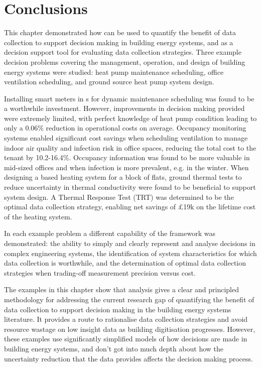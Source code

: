 \newpage
\section{Conclusions} \label{sec:demonstrations-conclusions}

This chapter demonstrated how  can be used to quantify the benefit of data collection to support decision making in building energy systems, and as a decision support tool for evaluating data collection strategies. Three example decision problems covering the management, operation, and design of building energy systems were studied: heat pump maintenance scheduling, office ventilation scheduling, and ground source heat pump system design.

Installing smart meters in s for dynamic maintenance scheduling was found to be a worthwhile investment. However, improvements in decision making provided were extremely limited, with perfect knowledge of heat pump condition leading to only a 0.06\% reduction in operational costs on average.
Occupancy monitoring systems enabled significant cost savings when scheduling ventilation to manage indoor air quality and infection risk in office spaces, reducing the total cost to the tenant by 10.2-16.4\%. Occupancy information was found to be more valuable in mid-sized offices and when infection is more prevalent, e.g. in the winter.
When designing a  based heating system for a block of flats, ground thermal tests to reduce uncertainty in thermal conductivity were found to be beneficial to support system design. A Thermal Response Test (TRT) was determined to be the optimal data collection strategy, enabling net savings of £19k on the lifetime cost of the heating system.

In each example problem a different capability of the  framework was demonstrated: the ability to simply and clearly represent and analyse decisions in complex engineering systems, the identification of system characteristics for which data collection is worthwhile, and the determination of optimal data collection strategies when trading-off measurement precision versus cost.

The examples in this chapter show that  analysis gives a clear and principled methodology for addressing the current research gap of quantifying the benefit of data collection to support decision making in the building energy systems literature. It provides a route to rationalise data collection strategies and avoid resource wastage on low insight data as building digitisation progresses. However, these examples use significantly simplified models of how decisions are made in building energy systems, and don't got into much depth about how the uncertainty reduction that the data provides affects the decision making process.